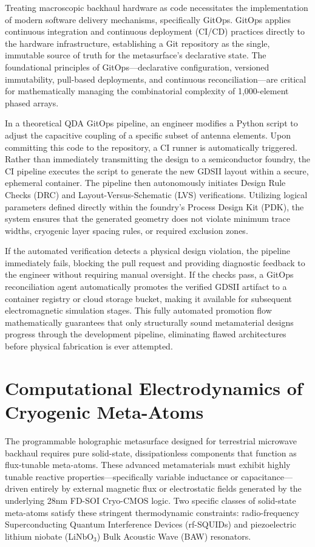 \documentclass[11pt,a4paper]{article}
\begin{document}
Treating macroscopic backhaul hardware as code necessitates the implementation of modern software delivery mechanisms, specifically GitOps.\cite{ref6} GitOps applies continuous integration and continuous deployment (CI/CD) practices directly to the hardware infrastructure, establishing a Git repository as the single, immutable source of truth for the metasurface's declarative state.\cite{ref6} The foundational principles of GitOps---declarative configuration, versioned immutability, pull-based deployments, and continuous reconciliation---are critical for mathematically managing the combinatorial complexity of 1,000-element phased arrays.\cite{ref6}

In a theoretical QDA GitOps pipeline, an engineer modifies a Python script to adjust the capacitive coupling of a specific subset of antenna elements. Upon committing this code to the repository, a CI runner is automatically triggered.\cite{ref6} Rather than immediately transmitting the design to a semiconductor foundry, the CI pipeline executes the script to generate the new GDSII layout within a secure, ephemeral container.\cite{ref6} The pipeline then autonomously initiates Design Rule Checks (DRC) and Layout-Versus-Schematic (LVS) verifications.\cite{ref6} Utilizing logical parameters defined directly within the foundry's Process Design Kit (PDK), the system ensures that the generated geometry does not violate minimum trace widths, cryogenic layer spacing rules, or required exclusion zones.\cite{ref6}

If the automated verification detects a physical design violation, the pipeline immediately fails, blocking the pull request and providing diagnostic feedback to the engineer without requiring manual oversight.\cite{ref6} If the checks pass, a GitOps reconciliation agent automatically promotes the verified GDSII artifact to a container registry or cloud storage bucket, making it available for subsequent electromagnetic simulation stages.\cite{ref6} This fully automated promotion flow mathematically guarantees that only structurally sound metamaterial designs progress through the development pipeline, eliminating flawed architectures before physical fabrication is ever attempted.\cite{ref6}

\section{Computational Electrodynamics of Cryogenic Meta-Atoms}

The programmable holographic metasurface designed for terrestrial microwave backhaul requires pure solid-state, dissipationless components that function as flux-tunable meta-atoms.\cite{ref6} These advanced metamaterials must exhibit highly tunable reactive properties---specifically variable inductance or capacitance---driven entirely by external magnetic flux or electrostatic fields generated by the underlying 28nm FD-SOI Cryo-CMOS logic.\cite{ref6} Two specific classes of solid-state meta-atoms satisfy these stringent thermodynamic constraints: radio-frequency Superconducting Quantum Interference Devices (rf-SQUIDs) and piezoelectric lithium niobate (LiNbO$_3$) Bulk Acoustic Wave (BAW) resonators.\cite{ref6}
\end{document}

